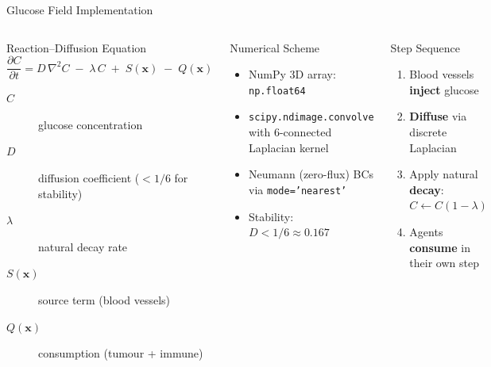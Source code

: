 \documentclass[aspectratio=169,10pt]{beamer}
\begin{document}
\begin{frame}{Glucose Field Implementation}
  \begin{columns}[T]
    \begin{block}{Reaction--Diffusion Equation}
      \[
        \frac{\partial C}{\partial t} = D\,\nabla^2 C \;-\; \lambda\,C \;+\; S(\mathbf{x}) \;-\; Q(\mathbf{x})
      \]
      \begin{description}
        \item[$C$] glucose concentration
        \item[$D$] diffusion coefficient ($< 1/6$ for stability)
        \item[$\lambda$] natural decay rate
        \item[$S(\mathbf{x})$] source term (blood vessels)
        \item[$Q(\mathbf{x})$] consumption (tumour + immune)
      \end{description}
    \end{block}

    \begin{block}{Numerical Scheme}
      \begin{itemize}
        \item NumPy 3D array: \texttt{np.float64}
        \item \texttt{scipy.ndimage.convolve} with 6-connected Laplacian kernel
        \item Neumann (zero-flux) BCs via \texttt{mode='nearest'}
        \item Stability: $D < 1/6 \approx 0.167$
      \end{itemize}
    \end{block}

    \begin{block}{Step Sequence}
      \begin{enumerate}
        \item Blood vessels \textbf{inject} glucose
        \item \textbf{Diffuse} via discrete Laplacian
        \item Apply natural \textbf{decay}: $C \leftarrow C(1-\lambda)$
        \item Agents \textbf{consume} in their own step
      \end{enumerate}
    \end{block}
  \end{columns}
\end{frame}
\end{document}
